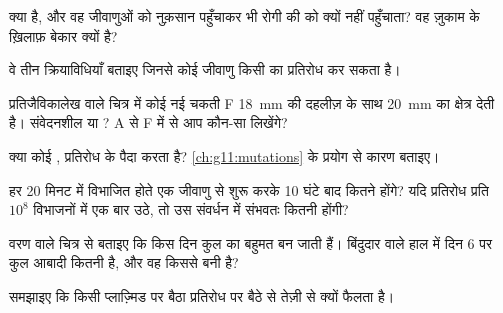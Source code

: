 \begin{exercise}[$\star$]\label{exo:g11:antibiotic-resistance:2}
 क्या है, और वह जीवाणुओं को नुक़सान पहुँचाकर भी रोगी की 
को क्यों नहीं पहुँचाता? वह ज़ुकाम के ख़िलाफ़ बेकार क्यों है?
\end{exercise}

\begin{exercise}[$\star$]\label{exo:g11:antibiotic-resistance:3}
वे तीन क्रियाविधियाँ बताइए जिनसे कोई जीवाणु किसी  का प्रतिरोध कर
सकता है।
\end{exercise}

\begin{exercise}[$\star$]\label{exo:g11:antibiotic-resistance:4}
प्रतिजैविकालेख वाले चित्र में कोई नई चकती F \qty{18}{mm} की दहलीज़ के साथ
\qty{20}{mm} का क्षेत्र देती है। संवेदनशील या ? A से F में से आप
कौन-सा  लिखेंगे?
\end{exercise}

\begin{exercise}[$\star$]\label{exo:g11:antibiotic-resistance:5}
क्या कोई , प्रतिरोध के  पैदा करता है?
\cref{ch:g11:mutations} के प्रयोग से कारण बताइए।
\end{exercise}

\begin{exercise}[$\star\star$]\label{exo:g11:antibiotic-resistance:6}
हर 20 मिनट में विभाजित होते एक जीवाणु से शुरू करके 10 घंटे बाद कितने
होंगे? यदि प्रतिरोध प्रति $10^8$ विभाजनों में एक बार उठे, तो उस संवर्धन
में संभवतः कितनी   होंगी?
\end{exercise}

\begin{exercise}[$\star\star$]\label{exo:g11:antibiotic-resistance:7}
वरण वाले चित्र से बताइए कि   किस दिन कुल का बहुमत बन
जाती हैं। बिंदुदार वाले हाल में दिन 6 पर कुल आबादी कितनी है, और वह किससे
बनी है?
\end{exercise}

\begin{exercise}[$\star\star$]\label{exo:g11:antibiotic-resistance:8}
समझाइए कि किसी प्लाज़्मिड पर बैठा प्रतिरोध   पर बैठे  से
तेज़ी से क्यों फैलता है।
\end{exercise}

